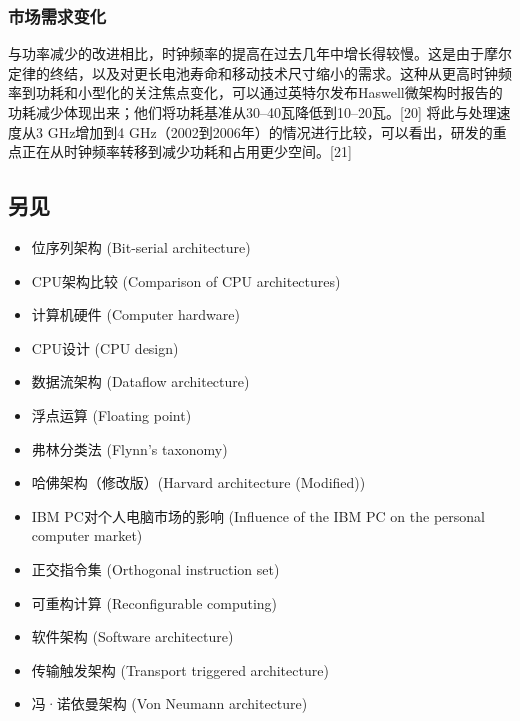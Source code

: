 \subsubsection{市场需求变化}  
与功率减少的改进相比，时钟频率的提高在过去几年中增长得较慢。这是由于摩尔定律的终结，以及对更长电池寿命和移动技术尺寸缩小的需求。这种从更高时钟频率到功耗和小型化的关注焦点变化，可以通过英特尔发布Haswell微架构时报告的功耗减少体现出来；他们将功耗基准从30–40瓦降低到10–20瓦。[20] 将此与处理速度从3 GHz增加到4 GHz（2002到2006年）的情况进行比较，可以看出，研发的重点正在从时钟频率转移到减少功耗和占用更少空间。[21]
\subsection{另见}  
\begin{itemize}
\item 位序列架构 (Bit-serial architecture)  
\item CPU架构比较 (Comparison of CPU architectures)  
\item 计算机硬件 (Computer hardware)  
\item CPU设计 (CPU design)  
\item 数据流架构 (Dataflow architecture)  
\item 浮点运算 (Floating point)  
\item 弗林分类法 (Flynn's taxonomy)  
\item 哈佛架构（修改版）(Harvard architecture (Modified))  
\item IBM PC对个人电脑市场的影响 (Influence of the IBM PC on the personal computer market)  
\item 正交指令集 (Orthogonal instruction set)  
\item 可重构计算 (Reconfigurable computing)  
\item 软件架构 (Software architecture)  
\item 传输触发架构 (Transport triggered architecture)  
\item 冯·诺依曼架构 (Von Neumann architecture)  
\end{itemize}
